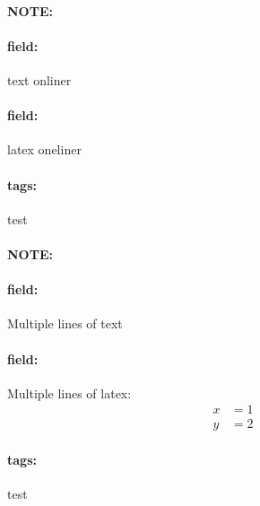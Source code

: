 \documentclass[12pt]{article}
\begin{document}
\newenvironment{note}{\paragraph{NOTE:}}{}
\newenvironment{field}{\paragraph{field:}}{}
\newenvironment{plain}{\paragraph{field:}}{}
\newcommand*{\tags}[1]{\paragraph{tags: }#1}
\newcommand*{\xplain}[1]{\paragraph{field: } #1}
\newcommand*{\xfield}[1]{\paragraph{field: } #1}

\begin{note}
  \xplain{text onliner}
  \xfield{latex oneliner}
  \tags{test}
\end{note}

\begin{note}
  \begin{plain}
    Multiple
    lines
    of text
  \end{plain}
  \begin{field}
    Multiple lines of latex:
    \begin{align}
      x &= 1 \\
      y &= 2
    \end{align}
  \end{field}
  \tags{test}
\end{note}
\end{document}
